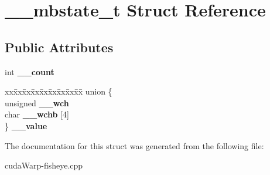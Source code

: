 \hypertarget{struct____mbstate__t}{}\section{\+\_\+\+\_\+mbstate\+\_\+t Struct Reference}
\label{struct____mbstate__t}
\subsection*{Public Attributes}
\begin{DoxyCompactItemize}
\item 
int {\bfseries \+\_\+\+\_\+count}\hypertarget{struct____mbstate__t_a076c784a64f56f06c9f6719b3fa8cad2}{}\label{struct____mbstate__t_a076c784a64f56f06c9f6719b3fa8cad2}

\item 
\begin{tabbing}
xx\=xx\=xx\=xx\=xx\=xx\=xx\=xx\=xx\=\kill
union \{\\
\>unsigned {\bfseries \_\_wch}\\
\>char {\bfseries \_\_wchb} \mbox{[}4\mbox{]}\\
\} {\bfseries \_\_value}\hypertarget{struct____mbstate__t_ae8e61f35018541b9190e8b19aeb392d8}{}\label{struct____mbstate__t_ae8e61f35018541b9190e8b19aeb392d8}
\\

\end{tabbing}\end{DoxyCompactItemize}


The documentation for this struct was generated from the following file\+:\begin{DoxyCompactItemize}
\item 
cuda\+Warp-\/fisheye.\+cpp\end{DoxyCompactItemize}
